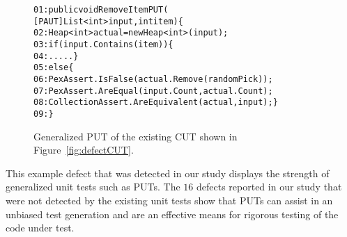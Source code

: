 \begin{figure}[t]
\begin{CodeOut}
\begin{alltt}
01: public void RemoveItemPUT(
\hspace*{0.7in} [PAUT]List<int> input, int item) \{
02: \hspace*{0.07in}Heap<int> actual = new Heap<int> (input);
03: \hspace*{0.07in}if (input.Contains(item)) \{
04: \hspace*{0.2in}..... \}
05: \hspace*{0.07in}else \{
06: \hspace*{0.2in}PexAssert.IsFalse(actual.Remove(randomPick));
07: \hspace*{0.2in}PexAssert.AreEqual(input.Count, actual.Count);
08: \hspace*{0.2in}CollectionAssert.AreEquivalent(actual, input);\}
09: \hspace*{0.02in}\}
\end{alltt}
\end{CodeOut} \vspace*{-2ex}
\caption{Generalized PUT of the existing CUT shown in Figure~\ref{fig:defectCUT}.} \vspace*{-2ex}
\label{fig:defectPUT} 
\end{figure}

This example defect that was detected in our study displays the strength of generalized unit tests such as PUTs. The $16$ defects reported in our study that were not detected by the existing unit tests show that PUTs can assist in an unbiased test generation and are an effective means for rigorous testing of the code under test.  
%
%
